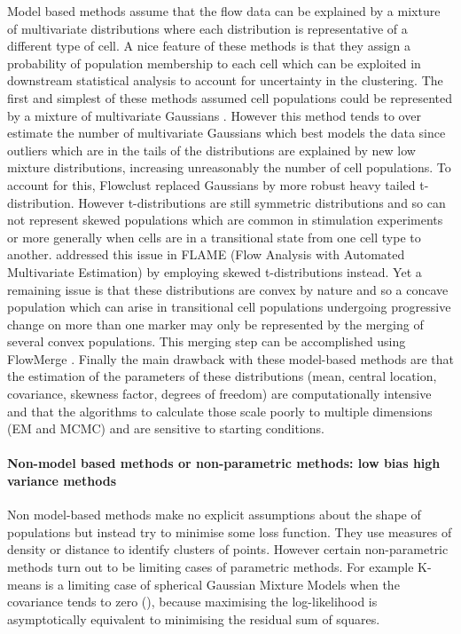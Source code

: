 Model based methods assume that the flow data can be explained by a mixture of multivariate distributions where each distribution is representative of a different type of cell.
A nice feature of these methods is that they assign a probability of population membership to each cell which can be exploited in downstream statistical analysis to account for uncertainty in the clustering.
The first and simplest of these methods assumed cell populations could be represented by a mixture of multivariate Gaussians \citep{Chan:2008gq}.
However this method tends to over estimate the number of multivariate Gaussians which best models the data since outliers which are in the tails of the distributions
are explained by new low mixture distributions, increasing unreasonably the number of cell populations.
To account for this, Flowclust \citep{Lo:2008it} replaced Gaussians by more robust heavy tailed t-distribution.
However t-distributions are still symmetric distributions and so can not represent skewed populations which are common in stimulation experiments or more generally when cells are in a transitional state from one cell type to another.
\citet{Pyne:2009hl} addressed this issue in FLAME (Flow Analysis with Automated Multivariate Estimation) by employing skewed t-distributions instead.
Yet a remaining issue is that these distributions are convex by nature and so a concave population which can arise in transitional cell populations undergoing progressive change on more than one marker may only be represented by the merging of several convex populations.
This merging step can be accomplished using FlowMerge \citep{Finak:2009fk}.
Finally the main drawback with these model-based methods are that the estimation of the parameters of these distributions (mean, central location, covariance, skewness factor, degrees of freedom) are computationally intensive and that the algorithms to calculate those scale poorly to multiple dimensions (EM \citep{Dempster:1977ul} and MCMC) and are sensitive to starting conditions.

\paragraph{Non-model based methods or non-parametric methods: low bias high variance methods}

Non model-based methods make no explicit assumptions about the shape of populations but instead try to minimise some loss function.
They use measures of density or distance to identify clusters of points.
However certain non-parametric methods turn out to be limiting cases of parametric methods.
For example K-means is a limiting case of spherical Gaussian Mixture Models when the covariance tends to zero (),
because maximising the log-likelihood is asymptotically equivalent to minimising the residual sum of squares.

